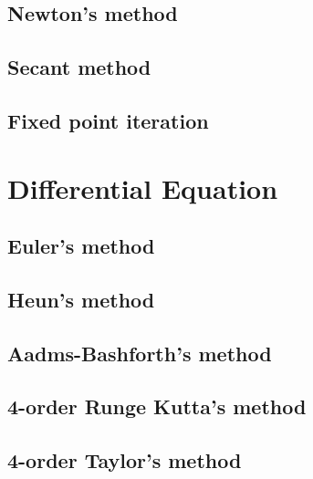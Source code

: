 \subsection{Newton's method\label{newton}}


\subsection{Secant method\label{secant}}


\subsection{Fixed point iteration\label{fixpt}}



\section{Differential Equation}
\subsection{Euler's method\label{euler}}


\subsection{Heun's method\label{heun}}


\subsection{Aadms-Bashforth's method\label{ab2}}


\subsection{4-order Runge Kutta's method\label{rk4}}


\subsection{4-order Taylor's method\label{taylor}}
